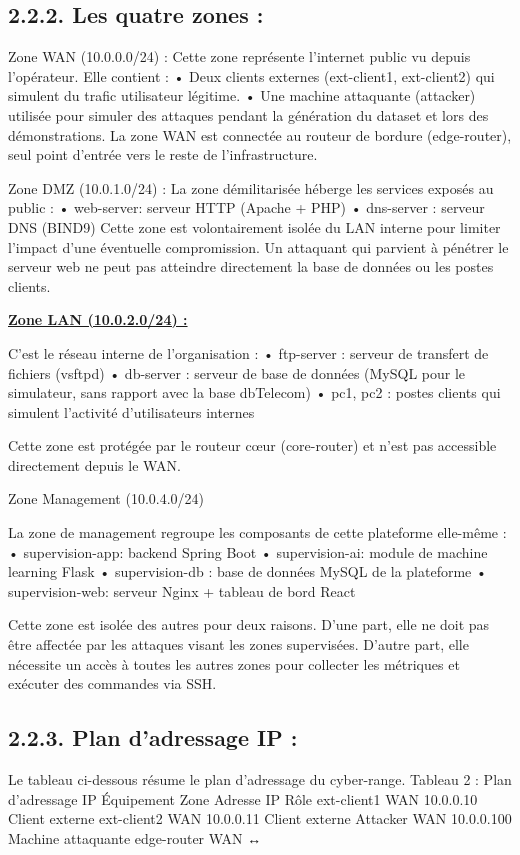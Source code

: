 \documentclass[12pt,a4paper]{report}
\newcommand{\ub}[1]{\uline{\textbf{#1}}}
\begin{document}
\subsection*{2.2.2. Les quatre zones :}
Zone WAN (10.0.0.0/24) : Cette zone représente l'internet public vu depuis l'opérateur. Elle contient : • Deux clients externes (ext-client1, ext-client2) qui simulent du trafic utilisateur légitime. • Une machine attaquante (attacker) utilisée pour simuler des attaques pendant la génération du dataset et lors des démonstrations. La zone WAN est connectée au routeur de bordure (edge-router), seul point d'entrée vers le reste de l'infrastructure.\par
Zone DMZ (10.0.1.0/24) : La zone démilitarisée héberge les services exposés au public : • web-server: serveur HTTP (Apache + PHP) • dns-server : serveur DNS (BIND9) Cette zone est volontairement isolée du LAN interne pour limiter l'impact d'une éventuelle compromission. Un attaquant qui parvient à pénétrer le serveur web ne peut pas atteindre directement la base de données ou les postes clients.\par
\ub{Zone LAN (10.0.2.0/24) :}\par
C'est le réseau interne de l'organisation : • ftp-server : serveur de transfert de fichiers (vsftpd) • db-server : serveur de base de données (MySQL pour le simulateur, sans rapport avec la base dbTelecom) • pc1, pc2 : postes clients qui simulent l'activité d'utilisateurs internes\par
Cette zone est protégée par le routeur cœur (core-router) et n'est pas accessible directement depuis le WAN.\par
Zone Management (10.0.4.0/24)\par
La zone de management regroupe les composants de cette plateforme elle-même : • supervision-app: backend Spring Boot • supervision-ai: module de machine learning Flask • supervision-db : base de données MySQL de la plateforme • supervision-web: serveur Nginx + tableau de bord React\par
Cette zone est isolée des autres pour deux raisons. D'une part, elle ne doit pas être affectée par les attaques visant les zones supervisées. D'autre part, elle nécessite un accès à toutes les autres zones pour collecter les métriques et exécuter des commandes via SSH.\par
\subsection*{2.2.3. Plan d'adressage IP :}
Le tableau ci-dessous résume le plan d'adressage du cyber-range. Tableau 2 : Plan d'adressage IP Équipement Zone Adresse IP Rôle ext-client1 WAN 10.0.0.10 Client externe ext-client2 WAN 10.0.0.11 Client externe Attacker WAN 10.0.0.100 Machine attaquante edge-router WAN ↔\par
\end{document}
